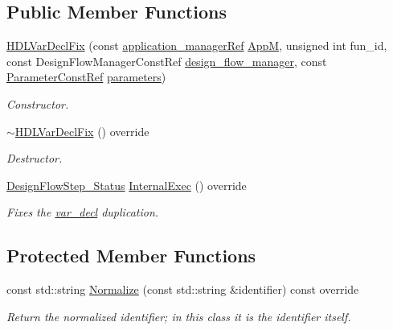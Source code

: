 \subsection*{Public Member Functions}
\begin{DoxyCompactItemize}
\item 
\hyperlink{classHDLVarDeclFix_aeea592f33dad08dbeaf49e67b1de5652}{H\+D\+L\+Var\+Decl\+Fix} (const \hyperlink{application__manager_8hpp_a04ccad4e5ee401e8934306672082c180}{application\+\_\+manager\+Ref} \hyperlink{classFrontendFlowStep_a0ac0d8db2a378416583f51c4faa59d15}{AppM}, unsigned int fun\+\_\+id, const Design\+Flow\+Manager\+Const\+Ref \hyperlink{classDesignFlowStep_ab770677ddf087613add30024e16a5554}{design\+\_\+flow\+\_\+manager}, const \hyperlink{Parameter_8hpp_a37841774a6fcb479b597fdf8955eb4ea}{Parameter\+Const\+Ref} \hyperlink{classDesignFlowStep_a802eaafe8013df706370679d1a436949}{parameters})
\begin{DoxyCompactList}\small\item\em Constructor. \end{DoxyCompactList}\item 
\hyperlink{classHDLVarDeclFix_a9102f36dc49a6a7421cf6e604849565b}{$\sim$\+H\+D\+L\+Var\+Decl\+Fix} () override
\begin{DoxyCompactList}\small\item\em Destructor. \end{DoxyCompactList}\item 
\hyperlink{design__flow__step_8hpp_afb1f0d73069c26076b8d31dbc8ebecdf}{Design\+Flow\+Step\+\_\+\+Status} \hyperlink{classHDLVarDeclFix_a89837edfac2c7f189baf7b0aada043da}{Internal\+Exec} () override
\begin{DoxyCompactList}\small\item\em Fixes the \hyperlink{structvar__decl}{var\+\_\+decl} duplication. \end{DoxyCompactList}\end{DoxyCompactItemize}
\subsection*{Protected Member Functions}
\begin{DoxyCompactItemize}
\item 
const std\+::string \hyperlink{classHDLVarDeclFix_ae06ae2d02410b645529a7b03fad9f0aa}{Normalize} (const std\+::string \&identifier) const override
\begin{DoxyCompactList}\small\item\em Return the normalized identifier; in this class it is the identifier itself. \end{DoxyCompactList}\end{DoxyCompactItemize}
